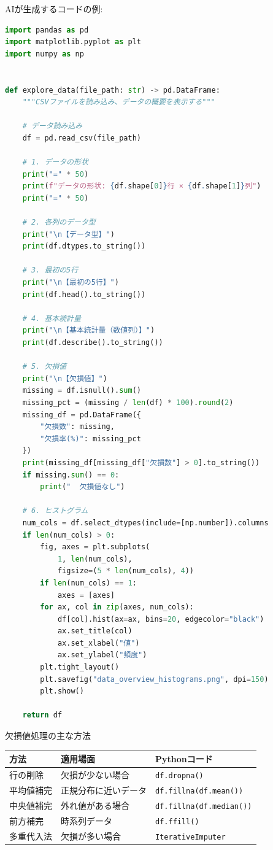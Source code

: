 AIが生成するコードの例:

\begin{lstlisting}[language=Python]
import pandas as pd
import matplotlib.pyplot as plt
import numpy as np


def explore_data(file_path: str) -> pd.DataFrame:
    """CSVファイルを読み込み、データの概要を表示する"""

    # データ読み込み
    df = pd.read_csv(file_path)

    # 1. データの形状
    print("=" * 50)
    print(f"データの形状: {df.shape[0]}行 × {df.shape[1]}列")
    print("=" * 50)

    # 2. 各列のデータ型
    print("\n【データ型】")
    print(df.dtypes.to_string())

    # 3. 最初の5行
    print("\n【最初の5行】")
    print(df.head().to_string())

    # 4. 基本統計量
    print("\n【基本統計量（数値列）】")
    print(df.describe().to_string())

    # 5. 欠損値
    print("\n【欠損値】")
    missing = df.isnull().sum()
    missing_pct = (missing / len(df) * 100).round(2)
    missing_df = pd.DataFrame({
        "欠損数": missing,
        "欠損率(%)": missing_pct
    })
    print(missing_df[missing_df["欠損数"] > 0].to_string())
    if missing.sum() == 0:
        print("  欠損値なし")

    # 6. ヒストグラム
    num_cols = df.select_dtypes(include=[np.number]).columns
    if len(num_cols) > 0:
        fig, axes = plt.subplots(
            1, len(num_cols),
            figsize=(5 * len(num_cols), 4))
        if len(num_cols) == 1:
            axes = [axes]
        for ax, col in zip(axes, num_cols):
            df[col].hist(ax=ax, bins=20, edgecolor="black")
            ax.set_title(col)
            ax.set_xlabel("値")
            ax.set_ylabel("頻度")
        plt.tight_layout()
        plt.savefig("data_overview_histograms.png", dpi=150)
        plt.show()

    return df
\end{lstlisting}

\begin{itembox}[l]{欠損値処理の主な方法}
\begin{table}[H]
\centering
\footnotesize
\begin{tabular}{lll}
\toprule
方法 & 適用場面 & Pythonコード \\
\midrule
行の削除 & 欠損が少ない場合 & \texttt{df.dropna()} \\
平均値補完 & 正規分布に近いデータ & \texttt{df.fillna(df.mean())} \\
中央値補完 & 外れ値がある場合 & \texttt{df.fillna(df.median())} \\
前方補完 & 時系列データ & \texttt{df.ffill()} \\
多重代入法 & 欠損が多い場合 & \texttt{IterativeImputer} \\
\bottomrule
\end{tabular}
\end{table}
\end{itembox}

